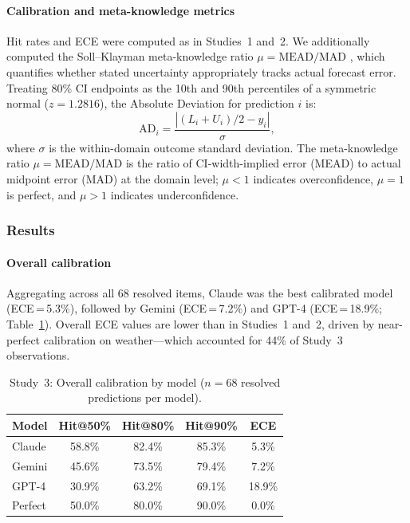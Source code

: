\paragraph{Calibration and meta-knowledge metrics} Hit rates and ECE were
computed as in Studies~1 and~2. We additionally computed the Soll--Klayman
meta-knowledge ratio $\mu = \text{MEAD}/\text{MAD}$ \citep{Soll2004},
which quantifies whether stated uncertainty appropriately tracks actual
forecast error. Treating 80\% CI endpoints as the 10th and 90th percentiles
of a symmetric normal ($z = 1.2816$), the Absolute Deviation for prediction
$i$ is:
\begin{equation}
  \label{eq:ad}
  \text{AD}_i = \frac{|(L_i + U_i)/2 - y_i|}{\sigma},
\end{equation}
where $\sigma$ is the within-domain outcome standard deviation. The
meta-knowledge ratio $\mu = \text{MEAD}/\text{MAD}$ is the ratio of
CI-width-implied error (MEAD) to actual midpoint error (MAD) at the
domain level; $\mu < 1$ indicates overconfidence, $\mu = 1$ is perfect,
and $\mu > 1$ indicates underconfidence.

\subsubsection*{Results}

\paragraph{Overall calibration} Aggregating across all 68 resolved items,
Claude was the best calibrated model (ECE\,=\,5.3\%), followed by Gemini
(ECE\,=\,7.2\%) and GPT-4 (ECE\,=\,18.9\%; Table~\ref{tab:study3-overall}).
Overall ECE values are lower than in Studies~1 and~2, driven by
near-perfect calibration on weather---which accounted for 44\% of
Study~3 observations.

\begin{table}[ht]
  \centering
  \caption{Study~3: Overall calibration by model ($n = 68$ resolved
    predictions per model).}
  \label{tab:study3-overall}
  \begin{tabular}{lcccc}
    \toprule
    Model   & Hit@50\% & Hit@80\% & Hit@90\% & ECE    \\
    \midrule
    Claude  & 58.8\%   & 82.4\%   & 85.3\%   & 5.3\%  \\
    Gemini  & 45.6\%   & 73.5\%   & 79.4\%   & 7.2\%  \\
    GPT-4   & 30.9\%   & 63.2\%   & 69.1\%   & 18.9\% \\
    \midrule
    Perfect & 50.0\%   & 80.0\%   & 90.0\%   & 0.0\%  \\
    \bottomrule
  \end{tabular}
\end{table}


